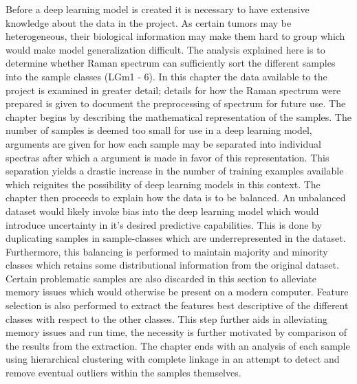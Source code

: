 Before a deep learning model is created it is necessary to have extensive knowledge about the data in the project. As certain tumors may be heterogeneous\cite{friedmann2014glioblastoma}, their biological information may make them hard to group which would make model generalization difficult. The analysis explained here is to determine whether Raman spectrum can sufficiently sort the different samples into the sample classes (LGm1 - 6). In this chapter the data available to the project is examined in greater detail; details for how the Raman spectrum were prepared is given to document the preprocessing of spectrum for future use. The chapter begins by describing the mathematical representation of the samples. The number of samples is deemed too small for use in a deep learning model, arguments are given for how each sample may be separated into individual spectras after which a argument is made in favor of this representation. This separation yields a drastic increase in the number of training examples available which reignites the possibility of deep learning models in this context. The chapter then proceeds to explain how the data is to be balanced. An unbalanced dataset would likely invoke bias into the deep learning model which would introduce uncertainty in it's desired predictive capabilities. This is done by duplicating samples in sample-classes which are underrepresented in the dataset. Furthermore, this balancing is performed to maintain majority and minority classes which retains some distributional information from the original dataset. Certain problematic samples are also discarded in this section to alleviate memory issues which would otherwise be present on a modern computer. Feature selection is also performed to extract the features best descriptive of the different classes with respect to the other classes. This step further aids in alleviating memory issues and run time, the necessity is further motivated by comparison of the results from the extraction. The chapter ends with an analysis of each sample using hierarchical clustering with complete linkage in an attempt to detect and remove eventual outliers within the samples themselves.


